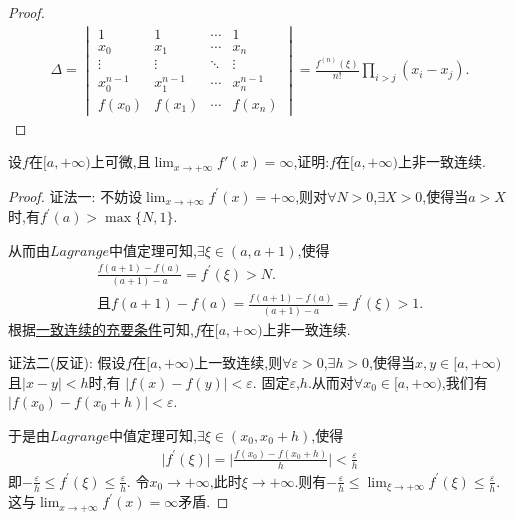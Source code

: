 \documentclass[lang=cn,newtx,10pt,scheme=chinese]{../Template/elegantbook}
\begin{document}
\begin{proof}
    \begin{align}
        \Delta = 
    \begin{vmatrix}
    1 & 1 & \cdots & 1 \\
    x_0 & x_1 & \cdots & x_n \\
    \vdots & \vdots & \ddots & \vdots \\
    x_0^{n-1} & x_1^{n-1} & \cdots & x_n^{n-1} \\
    f(x_0) & f(x_1) & \cdots & f(x_n)
    \end{vmatrix}
    = \frac{f^{(n)}(\xi)}{n!} \prod_{i > j} (x_i - x_j).
        \nonumber
    \end{align}
\end{proof}

\begin{exercise}
    设\(f\)在\([a, +\infty)\)上可微,且\(\lim_{x \to +\infty} f'(x) = \infty\),证明:\(f\)在\([a, +\infty)\)上非一致连续.
\end{exercise}
\begin{proof}
    {\color{blue}证法一:}
    不妨设\(\lim_{x\rightarrow +\infty} f^{\prime}(x)=+\infty\),则对\(\forall N > 0\),\(\exists X > 0\),使得当\(a > X\)时,有\(f^{\prime}(a) > \max\{N, 1\}\).

从而由\(Lagrange\)中值定理可知,\(\exists \xi \in (a, a + 1)\),使得
\begin{gather*}
   \frac{f(a + 1) - f(a)}{(a + 1) - a}=f^{\prime}(\xi) > N.
   \\
   \text{且}f(a + 1) - f(a)=\frac{f(a + 1) - f(a)}{(a + 1) - a}=f^{\prime}(\xi) > 1.
\end{gather*}
    根据\hyperref[pro:一致连续的充要条件1]{一致连续的充要条件}可知,\(f\)在\([a, +\infty)\)上非一致连续.

    {\color{blue}证法二(反证):}
    假设\(f\)在\([a, +\infty)\)上一致连续,则\(\forall \varepsilon > 0\),\(\exists h > 0\),使得当\(x,y\in [a, +\infty)\)且\(\vert x - y\vert < h\)时,有
    \(\vert f(x) - f(y)\vert < \varepsilon\).
固定\(\varepsilon\),\(h\).从而对\(\forall x_0\in [a, +\infty)\),我们有\(\vert f(x_0) - f(x_0 + h)\vert < \varepsilon\).

于是由\(Lagrange\)中值定理可知,\(\exists \xi \in (x_0, x_0 + h)\),使得
\begin{align*}
    \vert f^{\prime}(\xi)\vert=\vert\frac{f(x_0) - f(x_0 + h)}{h}\vert < \frac{\varepsilon}{h}
\end{align*}
即\(-\frac{\varepsilon}{h}\leqslant f^{\prime}(\xi) \leqslant \frac{\varepsilon}{h}\).
令\(x_0\rightarrow +\infty\),此时\(\xi \rightarrow +\infty\).则有\(-\frac{\varepsilon}{h}\leqslant \lim_{\xi \rightarrow +\infty}f^{\prime}(\xi) \leqslant \frac{\varepsilon}{h}\).这与\(\lim_{x\rightarrow +\infty}f^{\prime}(x) =\infty\)矛盾.
\end{proof}
\end{document}
